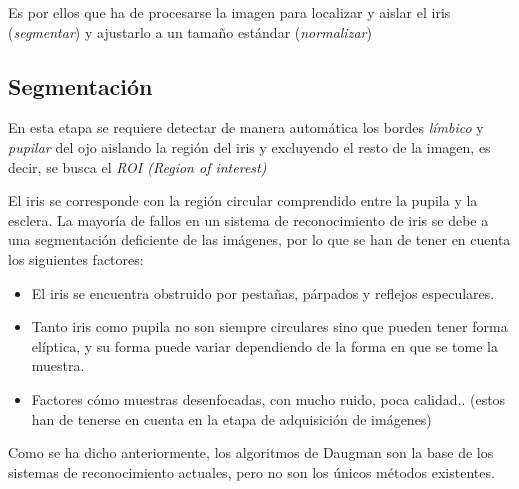 Es por ellos que ha de procesarse la imagen para localizar y aislar el iris (\emph{segmentar}) y ajustarlo a un tamaño estándar (\emph{normalizar})


\subsection{Segmentación} \label{segmentacion}
En esta etapa se requiere detectar de manera automática los bordes \emph{límbico} y \emph{pupilar} del ojo aislando la región del iris y excluyendo el resto de la imagen, es decir, se busca el \emph{ROI (Region of interest)}

El iris se corresponde con la región circular comprendido entre la pupila y la esclera.
La mayoría de fallos en un sistema de reconocimiento de iris se debe a una segmentación deficiente de las imágenes, por lo que se han de tener en cuenta los siguientes factores:
\begin{itemize}
    \item El iris se encuentra obstruido por pestañas, párpados y reflejos especulares.
    \item Tanto iris como pupila no son siempre circulares sino que pueden tener forma elíptica, y su forma puede variar dependiendo de la forma en que se tome la muestra.
    \item Factores cómo muestras desenfocadas, con mucho ruido, poca calidad.. (estos han de tenerse en cuenta en la etapa de adquisición de imágenes)
\end{itemize}

Como se ha dicho anteriormente, los algoritmos de Daugman son la base de los sistemas de reconocimiento actuales, pero no son los únicos métodos existentes.

